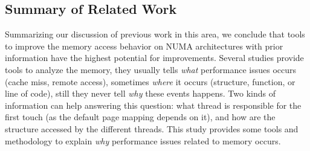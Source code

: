 \subsection{Summary of Related Work}

Summarizing our discussion of previous work in this area, we conclude that
tools to improve the memory access behavior on NUMA architectures with prior
information have the highest potential for improvements.  Several studies
provide tools to analyze the memory, they usually tells \emph{what}
performance issues occurs (cache miss, remote access), sometimes \emph{where}
it occurs (structure, function, or line of code), still they never tell
\emph{why} these events happens.  Two kinds of information can help answering
this question: what thread is responsible for the first touch (as the default
page mapping depends on it), and how are the structure accessed by the
different threads. This study provides some tools and methodology to explain
\emph{why} performance issues related to memory occurs.




